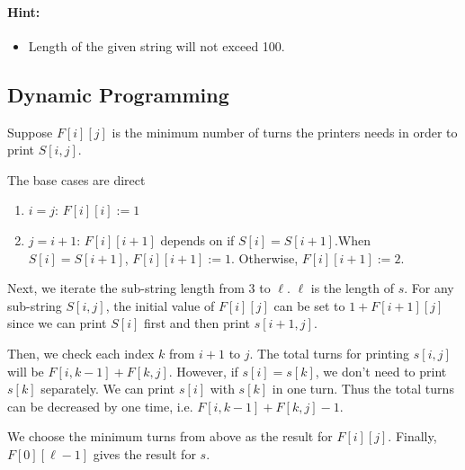 \paragraph{Hint:} 
\begin{itemize}
\item Length of the given string will not exceed 100.
\end{itemize}

\subsection{Dynamic Programming}
Suppose $F[i][j]$ is the minimum number of turns the printers needs in order to print $S[i, j]$. 

The base cases are direct

\begin{enumerate}
\item $i=j$: $F[i][i]:=1$
\item $j=i+1$: $F[i][i+1]$ depends on if $S[i]=S[i+1]$.When $S[i]=S[i+1]$, $F[i][i+1]:=1$. Otherwise, $F[i][i+1]:=2$.
\end{enumerate}

Next, we iterate the sub-string length from $3$ to $\ell$. $\ell$ is the length of $s$. For any sub-string $S[i,j]$, the initial value of $F[i][j]$ can be set to $1+F[i+1][j]$ since we can print $S[i]$ first and then print $s[i+1,j]$.

Then, we check each index $k$ from $i+1$ to $j$. The total turns for printing $s[i,j]$ will be $F[i,k-1]+F[k, j]$. However, if $s[i]=s[k]$, we don't need to print $s[k]$ separately. We can print $s[i]$ with $s[k]$ in one turn. Thus the total turns can be decreased by one time, i.e. $F[i,k-1]+F[k, j]-1$.

We choose the minimum turns from above as the result for $F[i][j]$. Finally, $F[0][\ell-1]$ gives the result for $s$.